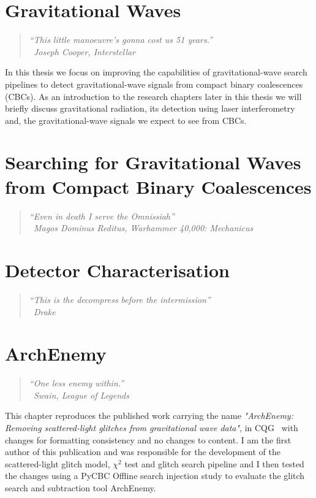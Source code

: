 \documentclass[12pt,twoside]{report} %
\makeatletter
\newcommand{\chapterquote}[2]{
  \begin{quote}
    \color{darkgray}\itshape #1 \\[1ex] %
    \raggedleft %
    \textemdash\ #2
  \end{quote}
}
\newcommand{\gwadj}{gravitational-wave\xspace}
\renewcommand{\cleardoublepage}{%
  \clearpage%
  \if@twoside
    \ifodd\c@page
    \else
      \hbox{}%
      \thispagestyle{empty}%
      \newpage
    \fi
  \fi
}
\let\oldchapter\chapter
\renewcommand{\chapter}{\cleardoublepage\oldchapter}
\makeatother
\begin{document}
\chapter[Gravitational Waves]{\label{chapter:1-gravitational-waves}Gravitational Waves}
\chapterquote{``This little manoeuvre's gonna cost us 51 years.''}{Joseph Cooper, Interstellar}
In this thesis we focus on improving the capabilities of \gwadj search pipelines to detect \gwadj signals from compact binary coalescences (CBCs). As an introduction to the research chapters later in this thesis we will briefly discuss gravitational radiation, its detection using laser interferometry and, the \gwadj signals we expect to see from CBCs.



\chapter[Searching for Gravitational-Waves from Compact Binary Coalescences]{\label{chapter:2-searches}Searching for Gravitational Waves from Compact Binary Coalescences}
\chapterquote{``Even in death I serve the Omnissiah''}{Magos Dominus Reditus, Warhammer 40,000: Mechanicus}


\chapter[Detector Characterisation]{\label{chapter:3-detchar}Detector Characterisation}
\chapterquote{``This is the decompress before the intermission''}{Drake}


\chapter[ArchEnemy]{\label{chapter:4-archenemy}ArchEnemy}
\chapterquote{``One less enemy within.''}{Swain, League of Legends}
This chapter reproduces the published work carrying the name \textit{"ArchEnemy: Removing scattered-light glitches from gravitational wave data"}, in CQG~\cite{ArchEnemy:2023} with changes for formatting consistency and no changes to content. I am the first author of this publication and was responsible for the development of the scattered-light glitch model, $\chi^{2}$ test and glitch search pipeline and I then tested the changes using a PyCBC Offline search injection study to evaluate the glitch search and subtraction tool ArchEnemy. 

\end{document}

